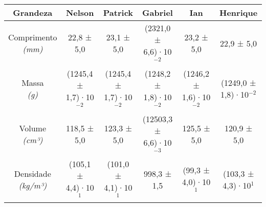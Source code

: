 \documentclass{article}
\begin{document}
\begin{table}[h!]
\centering
\begin{tabular}{c c c c c c }
\toprule
Grandeza & Nelson & Patrick & Gabriel & Ian & Henrique\\
\midrule
\shortstack{Comprimento\\\textit{(mm)}} & 22,8 ± 5,0 & 23,1 ± 5,0 & (2321,0 ± 6,6)·10$^{-2}$ & 23,2 ± 5,0 & 22,9 ± 5,0\\[4pt]
\shortstack{Massa\\\textit{(g)}} & (1245,4 ± 1,7)·10$^{-2}$ & (1245,4 ± 1,7)·10$^{-2}$ & (1248,2 ± 1,8)·10$^{-2}$ & (1246,2 ± 1,6)·10$^{-2}$ & (1249,0 ± 1,8)·10$^{-2}$\\[4pt]
\shortstack{Volume\\\textit{(cm³)}} & 118,5 ± 5,0 & 123,3 ± 5,0 & (12503,3 ± 6,6)·10$^{-3}$ & 125,5 ± 5,0 & 120,9 ± 5,0\\[4pt]
\shortstack{Densidade\\\textit{(kg/m³)}} & (105,1 ± 4,4)·10$^{1}$ & (101,0 ± 4,1)·10$^{1}$ & 998,3 ± 1,5 & (99,3 ± 4,0)·10$^{1}$ & (103,3 ± 4,3)·10$^{1}$\\[4pt]
\bottomrule
\end{tabular}
\end{table}
\end{document}

